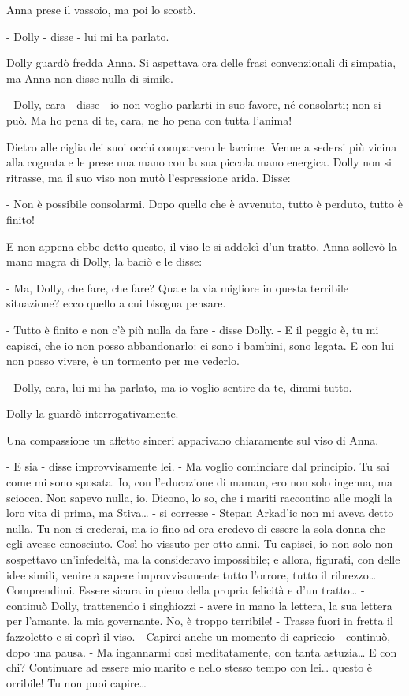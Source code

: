 Anna prese il vassoio, ma poi lo scostò. 

- Dolly - disse - lui mi ha parlato. 

Dolly guardò fredda Anna. Si aspettava ora delle frasi convenzionali di simpatia, ma Anna non disse nulla di simile. 

- Dolly, cara - disse - io non voglio parlarti in suo favore, né consolarti; non si può. Ma ho pena di te, cara, ne ho pena con tutta l'anima! 

Dietro alle ciglia dei suoi occhi comparvero le lacrime. Venne a sedersi più vicina alla cognata e le prese una mano con la sua piccola mano energica. Dolly non si ritrasse, ma il suo viso non mutò l'espressione arida. Disse: 

- Non è possibile consolarmi. Dopo quello che è avvenuto, tutto è perduto, tutto è finito! 

E non appena ebbe detto questo, il viso le si addolcì d'un tratto. Anna sollevò la mano magra di Dolly, la baciò e le disse: 

- Ma, Dolly, che fare, che fare? Quale la via migliore in questa terribile situazione? ecco quello a cui bisogna pensare. 

- Tutto è finito e non c'è più nulla da fare - disse Dolly. - E il peggio è, tu mi capisci, che io non posso abbandonarlo: ci sono i bambini, sono legata. E con lui non posso vivere, è un tormento per me vederlo. 

- Dolly, cara, lui mi ha parlato, ma io voglio sentire da te, dimmi tutto. 

Dolly la guardò interrogativamente. 

Una compassione un affetto sinceri apparivano chiaramente sul viso di Anna. 

- E sia - disse improvvisamente lei. - Ma voglio cominciare dal principio. Tu sai come mi sono sposata. Io, con l'educazione di maman, ero non solo ingenua, ma sciocca. Non sapevo nulla, io. Dicono, lo so, che i mariti raccontino alle mogli la loro vita di prima, ma Stiva\ldots{} - si corresse - Stepan Arkad'ic non mi aveva detto nulla. Tu non ci crederai, ma io fino ad ora credevo di essere la sola donna che egli avesse conosciuto. Così ho vissuto per otto anni. Tu capisci, io non solo non sospettavo un'infedeltà, ma la consideravo impossibile; e allora, figurati, con delle idee simili, venire a sapere improvvisamente tutto l'orrore, tutto il ribrezzo\ldots{} Comprendimi. Essere sicura in pieno della propria felicità e d'un tratto\ldots{} - continuò Dolly, trattenendo i singhiozzi - avere in mano la lettera, la sua lettera per l'amante, la mia governante. No, è troppo terribile! - Trasse fuori in fretta il fazzoletto e si coprì il viso. - Capirei anche un momento di capriccio - continuò, dopo una pausa. - Ma ingannarmi così meditatamente, con tanta astuzia\ldots{} E con chi? Continuare ad essere mio marito e nello stesso tempo con lei\ldots{} questo è orribile! Tu non puoi capire\ldots{} 

